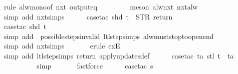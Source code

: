 \begin{isabellebody}
\ {\isacharparenleft}rule\ alw{\isacharunderscore}mono{\isacharbrackleft}of\ {\isachardoublequoteopen}nxt\ {\isacharparenleft}output{\isacharunderscore}eq\ {\isacharbrackleft}{\isacharbrackright}{\isacharparenright}{\isachardoublequoteclose}{\isacharbrackright}{\isacharparenright}\isanewline
\ \ \ \ \ \ \isamarkupfalse%
\ {\isacharparenleft}meson\ alw{\isacharunderscore}nxt\ nxt{\isacharunderscore}alw{\isacharparenright}\isanewline
\ \ \ \ \ \isamarkupfalse%
\ {\isacharparenleft}simp\ add{\isacharcolon}\ nxt{\isachardot}simps{\isacharparenright}\isanewline
\ \ \ \ \isamarkupfalse%
\ {\isacharparenleft}case{\isacharunderscore}tac\ {\isachardoublequoteopen}shd\ t\ {\isacharequal}\ {\isacharparenleft}STR\ {\isacharprime}{\isacharprime}return{\isacharprime}{\isacharprime}{\isacharcomma}\ {\isacharbrackleft}{\isacharbrackright}{\isacharparenright}{\isachardoublequoteclose}{\isacharparenright}\isanewline
\ \ \ \ \ \ \isamarkupfalse%
\ {}\isanewline
\ \ \ \ \ \ \isamarkupfalse%
\ {\isacharparenleft}case{\isacharunderscore}tac\ {\isachardoublequoteopen}shd\ t{\isachardoublequoteclose}{\isacharparenright}\isanewline
\ \ \ \ \ \ \isamarkupfalse%
\ {\isacharparenleft}simp\ add{\isacharcolon}\ \ possible{\isacharunderscore}steps{\isacharunderscore}{}{\isacharunderscore}invalid\ ltl{\isacharunderscore}step{\isachardot}simps\ alw{\isacharunderscore}must{\isacharunderscore}stop{\isacharunderscore}to{\isacharunderscore}open{\isacharunderscore}end{\isacharparenright}\isanewline
\ \ \ \ \ \isamarkupfalse%
\ {\isacharparenleft}simp\ add{\isacharcolon}\ nxt{\isachardot}simps{\isacharparenright}\isanewline
\ \ \ \ \ \isamarkupfalse%
\ {\isacharparenleft}erule\ exE{\isacharparenright}{\isacharplus}\isanewline
\ \ \ \ \isamarkupfalse%
\ {\isacharparenleft}simp\ add{\isacharcolon}\ ltl{\isacharunderscore}step{\isachardot}simps\ return\ apply{\isacharunderscore}updates{\isacharunderscore}def{\isacharparenright}\isanewline
\ \ \ \ \isamarkupfalse%
\ {\isacharparenleft}case{\isacharunderscore}tac\ {\isachardoublequoteopen}{\isasymexists}ta{\isachardot}\ stl\ t\ {\isacharequal}\ ta{\isachardoublequoteclose}{\isacharparenright}\isanewline
\ \ \ \ \ \ \isamarkupfalse%
\ {}\ \isamarkupfalse%
\ simp\isanewline
\ \ \ \ \ \isamarkupfalse%
\ fastforce\isanewline
\isanewline
\ \ \ \ \isamarkupfalse%
\ {\isacharparenleft}case{\isacharunderscore}tac\ {\isachardoublequoteopen}s\ {\isacharequal}\ {}{\isachardoublequoteclose}{\isacharparenright}\isanewline

\end{isabellebody}
